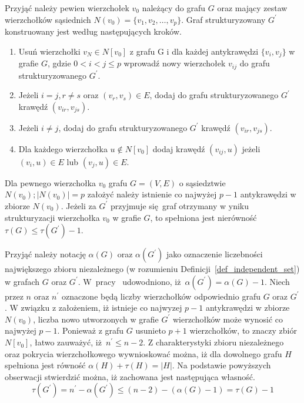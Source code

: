 {  Przyjąć należy pewien wierzchołek $v_0$ należący do grafu $G$ oraz mający zestaw wierzchołków sąsiednich $N(v_0)=\{v_1, v_2, \ldots, v_p\}$.
  Graf strukturyzowany $G^\prime$ konstruowany jest według następujących kroków.
  \begin{enumerate}
    \item Usuń wierzchołki $v_N \in N[v_0]$ z grafu G i dla każdej antykrawędzi $\{v_i, v_j\}$ w grafie $G$, gdzie $0 < i < j \leq p$ wprowadź nowy wierzchołek $v_{ij}$ do grafu strukturyzowanego $G^\prime$.
    \item Jeżeli $i=j, r\neq s$ oraz $(v_r, v_s) \in E$, dodaj do grafu strukturyzowanego $G^\prime$ krawędź $(v_{ir}, v_{js})$.
    \item Jeżeli $i \neq j$, dodaj do grafu strukturyzowanego $G^\prime$ krawędź $(v_{ir}, v_{js})$.
    \item Dla każdego wierzchołka $u \notin N[v_0]$ dodaj krawędź $(v_{ij}, u)$ jeżeli $(v_i, u) \in E$ lub $(v_j, u) \in E$.
  \end{enumerate}
  \begin{theorem}
    Dla pewnego wierzchołka $v_0$ grafu $G=(V, E)$ o sąsiedztwie $N(v_0); |N(v_0)|=p$ założyć należy istnienie co najwyżej $p-1$ antykrawędzi w zbiorze $N(v_0)$.
    Jeżeli za $G^\prime$ przyjmuje się graf otrzymany w yniku strukturyzacji wierzchołka $v_0$ w grafie $G$, to spełniona jest nierówność $\tau(G) \leq \tau(G^\prime) - 1$.
  \end{theorem}
  \begin{bproof}
    Przyjąć należy notację $\alpha(G)$ oraz $\alpha(G^\prime)$ jako oznaczenie liczebności największego zbioru niezależnego (w rozumieniu Definicji~\ref{def_independent_set}) w grafach $G$ oraz $G^\prime$.
    W~pracy~\cite{Ebengger:1984} udowodniono, iż $\alpha(G^\prime)=\alpha(G) - 1$.
    Niech przez $n$ oraz $n^\prime$ oznaczone będą liczby wierzchołków odpowiednio grafu $G$ oraz $G^\prime$.
    W związku z założeniem, iż istnieje co najwyzej $p - 1$ antykrawędzi w zbiorze $N(v_0)$, liczba nowo utworzonych w grafie $G^\prime$ wierzchołków może wynosić co najwyżej $p - 1$.
    Ponieważ z grafu $G$ usunieto $p+1$ wierzchołków, to znaczy zbiór $N[v_0]$, łatwo zauważyć, iż $n^\prime \leq n-2$.
    Z charakterystyki zbioru niezależnego oraz pokrycia wierzchołkowego wywnioskować można, iż dla dowolnego grafu $H$ spełniona jest równość $\alpha(H)+\tau(H)=|H|$.
    Na podstawie powyższych obserwacji stwierdzić można, iż zachowana jest następująca własność.
    \[\tau(G^\prime)=n^\prime-\alpha(G^\prime)\leq (n-2)-(\alpha(G)-1)=\tau(G)-1\]
  \end{bproof}
}

